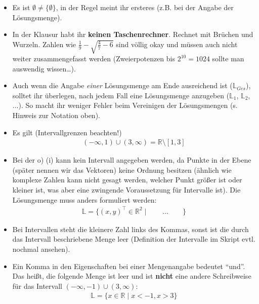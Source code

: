 \documentclass[11pt, a4paper]{article}
\newcommand{\Lsg}{\mathbb{L}}
\newcommand{\R}{\mathbb{R}}
\begin{document}
\begin{itemize}
\item Es ist $\emptyset \neq \{\emptyset\}$, in der Regel meint ihr ersteres (z.B. bei der Angabe der Lösungsmenge).

\item In der Klausur habt ihr \textbf{keinen Taschenrechner}. Rechnet mit Brüchen und Wurzeln. Zahlen wie $\frac{1}{9} - \sqrt{\frac{4}{7}-6}$ sind völlig okay und müssen auch nicht weiter zusammengefasst werden (Zweierpotenzen bis $2^{10} = 1024$ sollte man auswendig wissen\dots).

\item Auch wenn die Angabe \emph{einer} Lösungsmenge am Ende ausreichend ist ($\Lsg_{Ges}$), solltet ihr überlegen, nach jedem Fall eine Lösungsmenge anzugeben ($\Lsg_1$, $\Lsg_2$, $\dots$). So macht ihr weniger Fehler beim Vereinigen der Lösungsmengen (s. Hinweis zur Notation oben).

\item Es gilt (Intervallgrenzen beachten!)
\begin{align*}
(-\infty, 1) \cup (3, \infty) = \R \setminus [1, 3]
\end{align*}

\item Bei der o) (i) kann kein Intervall angegeben werden, da Punkte in der Ebene (später nennen wir das Vektoren) keine Ordnung besitzen (ähnlich wie komplexe Zahlen kann nicht gesagt werden, welcher Punkt größer ist oder kleiner ist, was aber eine zwingende Voraussetzung für Intervalle ist). Die Lösungsmenge muss anders formuliert werden:
\begin{align*}
\Lsg = \{ (x,y)^\intercal \in \R^2 \mid \qquad \dots \qquad \}
\end{align*}

\item Bei Intervallen steht die kleinere Zahl links des Kommas, sonst ist die durch das Intervall beschriebene Menge leer (Definition der Intervalle im Skript evtl. nochmal ansehen).

\item Ein Komma in den Eigenschaften bei einer Mengenangabe bedeutet \enquote{und}. Das heißt, die folgende Menge ist leer und ist  \textbf{nicht} eine andere Schreibweise für das Intervall $(-\infty, -1) \cup (3, \infty)$:
\begin{align*}
\Lsg = \{ x \in \R \mid x < -1, x > 3\}
\end{align*}
\end{itemize}
\end{document}
